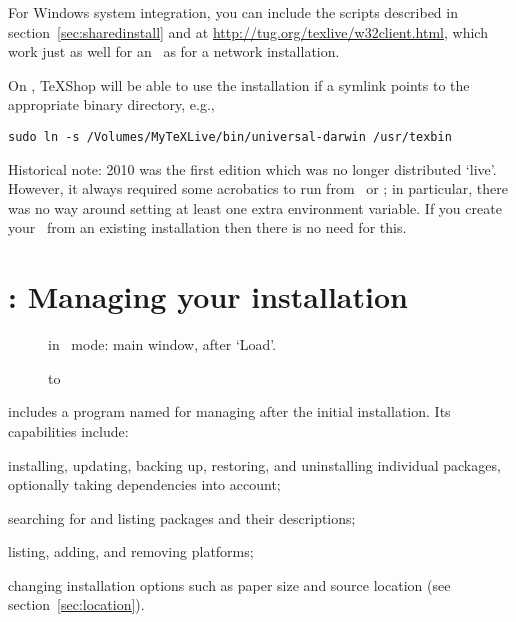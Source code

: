 \documentclass{article}
\begin{document}
For Windows system integration, you can include the 
scripts described in section~\ref{sec:sharedinstall} and at
\url{http://tug.org/texlive/w32client.html}, which work just as well for
an \ISO\ as for a network installation.

On \MacOSX, TeXShop will be able to use the 
installation if a symlink  points to the
appropriate binary directory, e.g.,
\begin{verbatim}
sudo ln -s /Volumes/MyTeXLive/bin/universal-darwin /usr/texbin
\end{verbatim}

Historical note: \TL{} 2010 was the first \TL{} edition which was no
longer distributed `live'.  However, it always required some acrobatics
to run from \DVD\ or \ISO; in particular, there was no way around
setting at least one extra environment variable.  If you create your
\ISO\ from an existing installation then there is no need for this.


\section{: Managing your installation}
\label{sec:tlmgr}

\begin{figure}[tb]
\caption{ in \GUI\ mode: main window, after `Load'.}
\label{fig:tlmgr-gui}
\end{figure}

\begin{figure}[tb]
\hbox to 
\end{figure}

\TL{} includes a program named  for managing \TL{} after the
initial installation.  Its capabilities include:

\begin{itemize*}
\item installing, updating, backing up, restoring, and uninstalling
  individual packages, optionally taking dependencies into account;
\item searching for and listing packages and their descriptions;
\item listing, adding, and removing platforms;
\item changing installation options such as paper size and source
  location (see section~\ref{sec:location}).
\end{itemize*}
\end{document}
